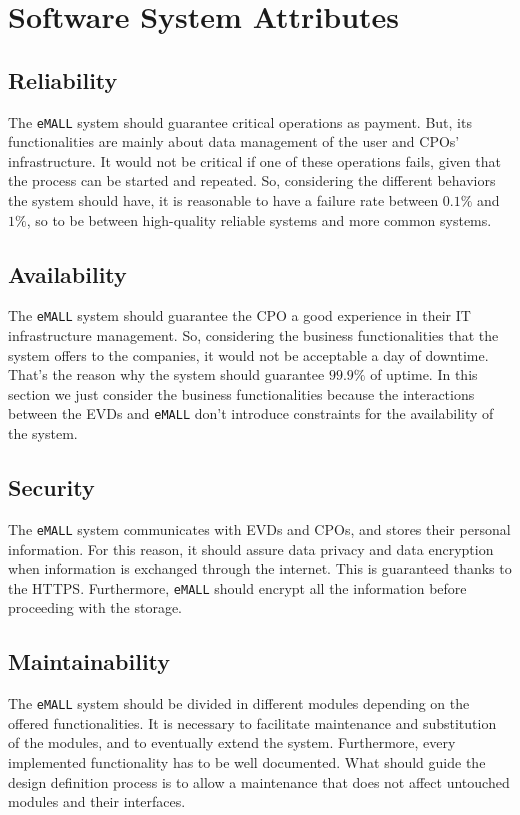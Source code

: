 \section{Software System Attributes}
\label{sec:software_system_attributes}%

\subsection{Reliability}
\label{subsec:reliability}%
The \verb|eMALL| system should guarantee critical operations as payment.
But, its functionalities are mainly about data management of the user and CPOs' infrastructure.
It would not be critical if one of these operations fails, given that the process can be started and repeated.
So, considering the different behaviors the system should have, it is reasonable to have a failure rate
between $0.1\%$ and $1\%$, so to be between high-quality reliable systems and more common systems.

\subsection{Availability}
\label{subsec:availability}%
The \verb|eMALL| system should guarantee the CPO a good experience in their IT infrastructure management.
So, considering the business functionalities that the system offers to the companies, it would not be acceptable a day of downtime.
That's the reason why the system should guarantee $99.9\%$ of uptime.
In this section we just consider the business functionalities because the interactions between the EVDs and \verb|eMALL|
don't introduce constraints for the availability of the system.

\subsection{Security}
\label{subsec:security}%
The \verb|eMALL| system communicates with EVDs and CPOs, and stores their personal information.
For this reason, it should assure data privacy and data encryption when information is exchanged through the internet.
This is guaranteed thanks to the HTTPS\@.
Furthermore, \verb|eMALL| should encrypt all the information before proceeding with the storage.

\subsection{Maintainability}
\label{subsec:maintainability}%
The \verb|eMALL| system should be divided in different modules depending on the offered functionalities.
It is necessary to facilitate maintenance and substitution of the modules, and to eventually extend the system.
Furthermore, every implemented functionality has to be well documented.
What should guide the design definition process is to allow a maintenance that does not affect untouched modules and their interfaces.

